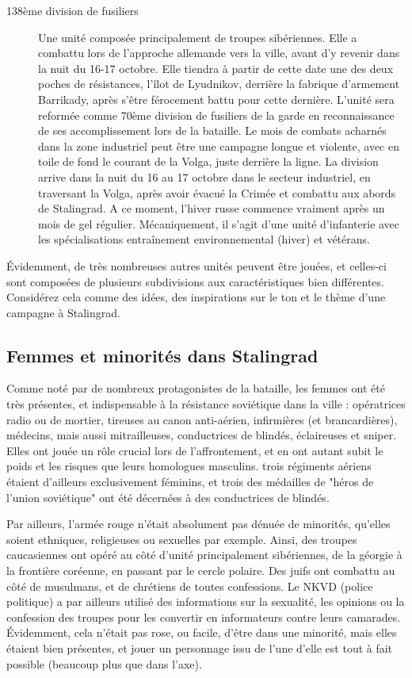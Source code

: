 \documentclass{report}
\begin{document}
\begin{multicols}{2}
\begin{description}
\item[138ème division de fusiliers]Une unité composée principalement de troupes sibériennes. Elle a combattu lors de l'approche allemande vers la ville, avant d'y revenir dans la nuit du 16-17 octobre. Elle tiendra à partir de cette date une des deux poches de résistances, l'îlot de Lyudnikov, derrière la fabrique d'armement Barrikady, après s'être férocement battu pour cette dernière. L'unité sera reformée comme 70ème division de fusiliers de la garde en reconnaissance de ses accomplissement lors de la bataille. Le mois de combats acharnés dans la zone industriel peut être une campagne longue et violente, avec en toile de fond le courant de la Volga, juste derrière la ligne. La division arrive dans la nuit du 16 au 17 octobre dans le secteur industriel, en traversant la Volga, après avoir évacué la Crimée et combattu aux abords de Stalingrad. A ce moment, l'hiver russe commence vraiment après un mois de gel régulier. Mécaniquement, il s'agit d'une unité d'infanterie avec les spécialisations entraînement environnemental (hiver) et vétérans.
\end{description}
Évidemment, de très nombreuses autres unités peuvent être jouées, et celles-ci sont composées de plusieurs subdivisions aux caractéristiques bien différentes. Considérez cela comme des idées, des inspirations sur le ton et le thème d'une campagne à Stalingrad.

\subsection{Femmes et minorités dans Stalingrad}
Comme noté par de nombreux protagonistes de la bataille, les femmes ont été très présentes, et indispensable à la résistance soviétique dans la ville : opératrices radio ou de mortier, tireuses au canon anti-aérien, infirmières (et brancardières), médecins, mais aussi mitrailleuses, conductrices de blindés, éclaireuses et sniper. Elles ont jouée un rôle crucial lors de l'affrontement, et en ont autant subit le poids et les risques que leurs homologues masculins. trois régiments aériens étaient d'ailleurs exclusivement féminins, et trois des médailles de "héros de l'union soviétique" ont été décernées à des conductrices de blindés.

Par ailleurs, l'armée rouge n'était absolument pas dénuée de minorités, qu'elles soient ethniques, religieuses ou sexuelles par exemple. Ainsi, des troupes caucasiennes ont opéré au côté d'unité principalement sibériennes, de la géorgie à la frontière coréenne, en passant par le cercle polaire. Des juifs ont combattu au côté de musulmans, et de chrétiens de toutes confessions. Le NKVD (police politique) a par ailleurs utilisé des informations sur la sexualité, les opinions ou la confession des troupes pour les convertir en informateurs contre leurs camarades. Évidemment, cela n'était pas rose, ou facile, d'être dans une minorité, mais elles étaient bien présentes, et jouer un personnage issu de l'une d'elle est tout à fait possible (beaucoup plus que dans l'axe).

\end{multicols}
\end{document}
